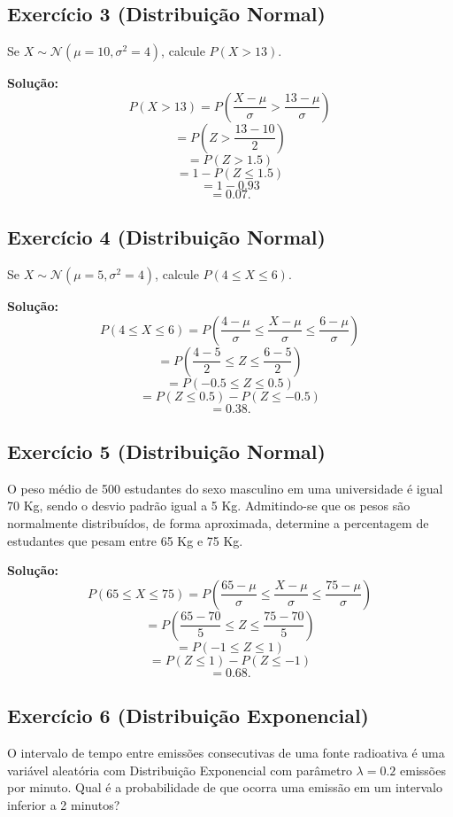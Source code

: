 \documentclass{article}
\begin{document}
\subsection{Exercício 3 (Distribuição Normal)}
Se $X \sim \mathcal{N}(\mu = 10, \sigma^2 = 4)$, calcule $P(X > 13)$.

\vspace{0.5cm}
\textbf{Solução:} 
    $$
    P(X > 13) = P\left(\frac{X - \mu}{\sigma} > \frac{13 - \mu}{\sigma}\right)
    $$
    $$
    = P\left(Z > \frac{13 - 10}{2}\right)
    $$
    $$
    = P(Z > 1.5)
    $$
    $$
    = 1 - P(Z \leq 1.5)
    $$
    $$
    = 1 - 0.93
    $$
    $$
    = 0.07.
    $$

\subsection{Exercício 4 (Distribuição Normal)}
Se $X \sim \mathcal{N}(\mu = 5, \sigma^2 = 4)$, calcule $P(4 \leq X \leq 6)$.

\vspace{0.5cm}
\textbf{Solução:} 
    $$
    P(4 \leq X \leq 6) = P\left(\frac{4 - \mu}{\sigma} \leq \frac{X - \mu}{\sigma} \leq \frac{6 - \mu}{\sigma}\right)
    $$
    $$
    = P\left(\frac{4 - 5}{2} \leq Z \leq \frac{6 - 5}{2}\right)
    $$
    $$
    = P(-0.5 \leq Z \leq 0.5)
    $$
    $$
    = P(Z \leq 0.5) - P(Z \leq -0.5)
    $$
    $$
    = 0.38.
    $$

\subsection{Exercício 5 (Distribuição Normal)}
O peso médio de 500 estudantes do sexo masculino em uma universidade é igual 70 Kg, sendo o desvio padrão igual a 5 Kg. Admitindo-se que os pesos são normalmente distribuídos, de forma aproximada, determine a percentagem de estudantes que pesam entre 65 Kg e 75 Kg.

\vspace{0.5cm}
\textbf{Solução:} 
    $$
    P(65 \leq X \leq 75) = P\left(\frac{65 - \mu}{\sigma} \leq \frac{X - \mu}{\sigma} \leq \frac{75 - \mu}{\sigma}\right)
    $$
    $$
    = P\left(\frac{65 - 70}{5} \leq Z \leq \frac{75 - 70}{5}\right)
    $$ 
    $$
    = P(-1 \leq Z \leq 1)
    $$
    $$
    = P(Z \leq 1) - P(Z \leq -1)
    $$
    $$
    = 0.68.
    $$

\subsection{Exercício 6 (Distribuição Exponencial)}
O intervalo de tempo entre emissões consecutivas de uma fonte radioativa é uma variável aleatória com Distribuição Exponencial com parâmetro $\lambda = 0.2$ emissões por minuto. Qual é a probabilidade de que ocorra uma emissão em um intervalo inferior a 2 minutos?
\end{document}
